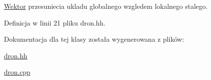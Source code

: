 \mbox{\hyperlink{class_wektor}{Wektor}} przesuniecia ukladu globalnego wzgledem lokalnego stalego. 

Definicja w linii 21 pliku dron.\+hh.



Dokumentacja dla tej klasy została wygenerowana z plików\+:\begin{DoxyCompactItemize}
\item 
\mbox{\hyperlink{dron_8hh}{dron.\+hh}}\item 
\mbox{\hyperlink{dron_8cpp}{dron.\+cpp}}\end{DoxyCompactItemize}
